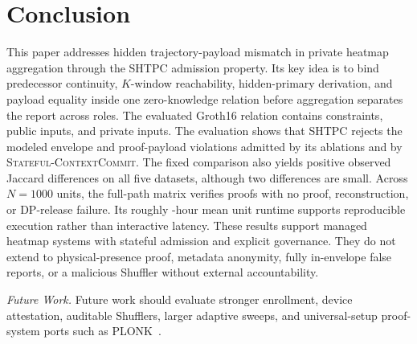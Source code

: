 \documentclass[journal]{IEEEtran}
\theoremstyle{definition}
\theoremstyle{plain}
\begin{document}
\section{Conclusion}
\label{sec:conclusion}

This paper addresses hidden trajectory-payload mismatch in private heatmap
aggregation through the SHTPC admission property. Its key idea is to bind
predecessor continuity, \(K\)-window reachability, hidden-primary derivation,
and payload equality inside one zero-knowledge relation before aggregation
separates the report across roles. The evaluated Groth16 relation contains
\VFourConstraints{} constraints, \VFourPublicInputs{} public inputs, and
\VFourPrivateInputs{} private inputs. The evaluation shows that SHTPC rejects
the modeled envelope and proof-payload violations admitted by its ablations and
by \textsc{Stateful-ContextCommit}. The fixed comparison also yields positive
observed Jaccard differences on all five datasets, although two differences are
small. Across \VFourScaleUnits{} \(N{=}1000\) units, the full-path matrix
verifies \VFourScaleProofs{} proofs with no proof, reconstruction, or DP-release
failure. Its roughly \VFourScaleWallHoursMean{}-hour mean unit runtime supports
reproducible execution rather than interactive latency. These results support
managed heatmap systems with stateful admission and explicit governance. They
do not extend to physical-presence proof, metadata anonymity, fully in-envelope
false reports, or a malicious Shuffler without external accountability.

\noindent\emph{Future Work.}
Future work should evaluate stronger enrollment, device attestation, auditable
Shufflers, larger adaptive sweeps, and universal-setup proof-system ports such
as PLONK~\cite{Gabizon2019PLONK}.

\printbibliography
\end{document}
